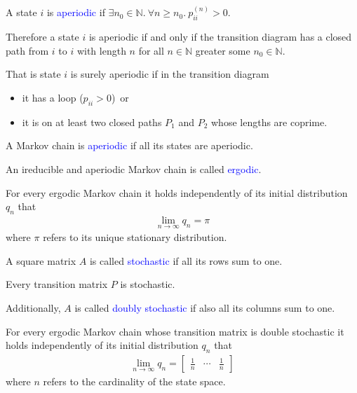 \documentclass{beamer}
\def\padding{\vspace{0.5cm}}
\def\spadding{\vspace{0.25cm}}
\def\b{\textcolor{blue}}
\begin{document}
\begin{frame}
    \begin{definition}
        A state $i$ is \b{aperiodic} if $\exists n_0 \in \mathbb{N}.\ \forall n \geq n_0.\ p_{ii}^{(n)} > 0$.\pause\par\spadding
        Therefore a state $i$ is aperiodic if and only if the transition diagram has a closed path from $i$ to $i$ with length $n$ for all $n \in \mathbb{N}$ greater some $n_0 \in \mathbb{N}$.\pause\par\spadding
        That is state $i$ is surely aperiodic if in the transition diagram
        \begin{itemize}
            \item it has a loop ($p_{ii} > 0$)\pause\ or
            \item it is on at least two closed paths $P_1$ and $P_2$ whose lengths are coprime.
        \end{itemize}\pause\par\padding
        A Markov chain is \b{aperiodic} if all its states are aperiodic.
    \end{definition}
\end{frame}

\begin{frame}
    \begin{definition}
        An ireducible and aperiodic Markov chain is called \b{ergodic}.
    \end{definition}\pause\par\padding
    For every ergodic Markov chain it holds independently of its initial distribution $q_n$ that
    \begin{align*}
        \lim_{n \to \infty} q_n = \pi
    \end{align*}
    where $\pi$ refers to its unique stationary distribution.
\end{frame}

\begin{frame}
    \begin{definition}
        A square matrix $A$ is called \b{stochastic} if all its rows sum to one.\pause\par
        Every transition matrix $P$ is stochastic.\pause\par\spadding
        Additionally, $A$ is called \b{doubly stochastic} if also all its columns sum to one.
    \end{definition}\pause\par\padding
    For every ergodic Markov chain whose transition matrix is double stochastic it holds independently of its initial distribution $q_n$ that
    \begin{align*}
        \lim_{n \to \infty} q_n = \begin{bmatrix}
            \frac{1}{n} & \cdots & \frac{1}{n}
        \end{bmatrix}
    \end{align*}
    where $n$ refers to the cardinality of the state space.
\end{frame}
\end{document}
